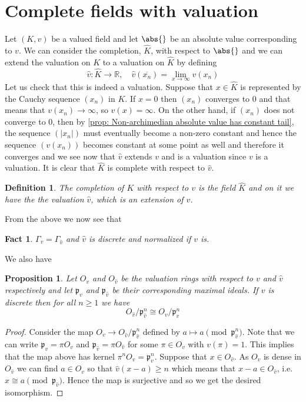 \documentclass{article}
\newtheorem{definition}{Definition}[section]
\newtheorem{proposition}{Proposition}[section]
\newtheorem{fact}{Fact}[section]
\newcommand{\mfrak}[1]{\mathfrak{#1}}
\newcommand{\mbb}[1]{\mathbb{#1}}
\numberwithin{equation}{section}
\begin{document}
\section{Complete fields with valuation}
Let $(K, v)$ be a valued field and let $\abs{}$ be an absolute value corresponding to $v$. We can consider the completion, $\hat K$, with respect to $\abs{}$ and we can extend the valuation on $K$ to a valuation on $\hat K$ by defining 
$$\hat v : \hat K \to \mbb R, \quad \hat v(\overline {x_n}) = \lim_{x \to \infty} v(x_n)$$ 
Let us check that this is indeed a valuation. Suppose that $x \in \hat K$ is represented by the Cauchy sequence $(x_n)$ in $K$. If $x = 0$ then $(x_n)$ converges to 0 and that means that $v(x_n) \to \infty$, so $\hat v(x) = \infty$. On the other hand, if $(x_n)$ does not converge to 0, then by \cref{prop: Non-archimedian absolute value has constant tail}, the sequence $(|x_n|)$ must eventually become a non-zero constant and hence the sequence $(v(x_n))$ becomes constant at some point as well and therefore it converges and we see now that $\hat v$ extends $v$ and is a valuation since $v$ is a valuation. It is clear that $\hat K$ is complete with respect to $\hat v$.

\begin{definition}
    The completion of $K$ with respect to $v$ is the field $\hat K$ and on it we have the the valuation $\hat v$, which is an extension of $v$. 
\end{definition}
From the above we now see that
\begin{fact}\label{K and completion of K have same value group}
    $\Gamma_v = \Gamma_{\hat v}$ and $\hat v$ is discrete and normalized if $v$ is.
\end{fact}

We also have
\begin{proposition}\label{prop: Isomorphism of residue fields valued field and its completion}
    Let $O_v$ and $O_{\hat v}$ be the valuation rings with respect to $v$ and $\hat v$ respectively and let $\mfrak p_v$ and $\mfrak p_{\hat v}$ be their corresponding maximal ideals. 
    If $v$ is discrete then for all $n \geq 1$ we have
    $$O_{\hat v} / \mfrak p_{\hat v}^n \cong O_v / \mfrak p_v^n$$
\end{proposition}
\begin{proof}
    Consider the map $O_v \to O_{\hat v} / \mfrak p_{\hat v}^n$ defined by $a \mapsto a \pmod {\mfrak p_{\hat v}^n}$. Note that we can write $\mfrak p_v = \pi O_v$ and $\mfrak p_{\hat v} = \pi O_{\hat v}$ for some $\pi \in O_v$ with $v(\pi) = 1$. This implies that the map above has kernel $\pi^n O_v = \mfrak p_v^n$. Suppose that $x \in O_{\hat v}$. As $O_v$ is dense in $O_{\hat v}$ we can find $a \in O_v$ so that $\hat v(x - a) \geq n$ which means that $x - a \in O_{\hat v}$, i.e. $x \cong a \pmod {\mfrak p_{\hat v}}$. Hence the map is surjective and so we get the desired isomorphism.
\end{proof}
\end{document}
